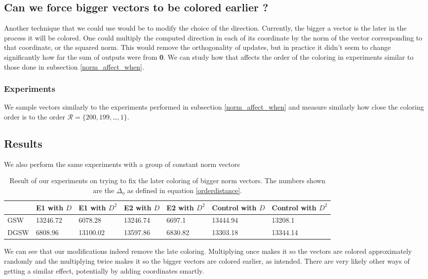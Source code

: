 \documentclass[12pt]{article}
\begin{document}
\subsection{Can we force bigger vectors to be colored earlier ?}
Another technique that we could use would be to modify the choice of the direction. Currently, the bigger a vector is the later in the process it will be colored. One could multiply the computed direction in each of its coordinate by the norm of the vector corresponding to that coordinate, or the squared norm. %
This would remove the orthogonality of updates, but in practice it didn't seem to change significantly how far the sum of outputs were from \textbf{0}. We can study how that affects the order of the coloring in experiments similar to those done in subsection \ref{norm_affect_when}.

\subsubsection{Experiments}
We sample vectors similarly to the experiments performed in subsection \ref{norm_affect_when} and measure similarly how close the coloring order is to the order $\mathcal{R}=\{200,199,$\dots$,1\}$.
\subsection{Results}
We also perform the same experiments with a group of constant norm vectors
\begin{center}
\begin{table}[h]
\begin{tabular}{l|llllll}
 &E1 with $D$&E1 with $D^2$& E2 with $D$&E2 with $D^2$& Control with $D$&Control with $D^2$   \\
\hline
GSW&13246.72&6078.28&13246.74&6697.1&13444.94&13208.1\\
DGSW&6808.96&13100.02&13597.86&6830.82&13303.18&13344.14
\end{tabular}
\caption{Result of our experiments on trying to fix the later coloring of bigger norm vectors. The numbers shown are the $\Delta_o$ as defined in equation \ref{orderdistance}.}
\label{norm_earlier}
\end{table}
\end{center}

We can see that our modifications indeed remove the late coloring. Multiplying once makes it so the vectors are colored approximately randomly and the multiplying twice makes it so the bigger vectors are colored earlier, as intended. There are very likely other ways of getting a similar effect, potentially by adding coordinates smartly.
\end{document}
